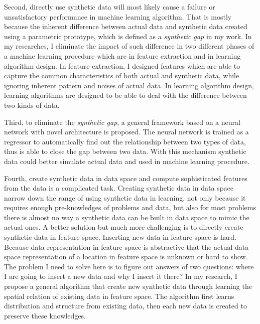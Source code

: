 \documentclass{iitthesis}
\begin{document}
Second, directly use synthetic data will most likely cause a failure or unsatisfactory performance in machine learning algorithm. That is mostly because the inherent difference between actual data and synthetic data created using a parametric prototype, which is defined as a \textit{synthetic gap} in my work. In my researches, I eliminate the impact of such difference in two different phases of a machine learning procedure which are in feature extraction and in learning algorithm design. In feature extraction, I designed features which are able to capture the common characteristics of both actual and synthetic data, while ignoring inherent pattern and noises of actual data. In learning algorithm design, learning algorithms are designed to be able to deal with the difference between two kinds of data. 

Third, to eliminate the \textit{synthetic gap}, a general framework based on a neural network with novel architecture is proposed. The neural network is trained as a regressor to automatically find out the relationship between two types of data, thus is able to close the gap between two data. With this mechanism synthetic data could better simulate actual data and used in machine learning procedure.

Fourth, create synthetic data in data space and compute sophisticated features from the data is a complicated task. Creating synthetic data in data space narrow down the range of using synthetic data in learning, not only because it requires enough pre-knowledges of problems and data, but also for most problems there is almost no way a synthetic data can be built in data space to mimic the actual ones. A better solution but much more challenging is to directly create synthetic data in feature space. Inserting new data in feature space is hard. Because data representation in feature space is abstractive that the actual data space representation of a location in feature space is unknown or hard to show. The problem I need to solve here is to figure out answers of two questions: where I are going to insert a new data and why I insert it there? In my research, I propose a general algorithm that create new synthetic data through learning the spatial relation of existing data in feature space. The algorithm first learns distribution and structure from existing data, then each new
data is created to preserve these knowledges.



\clearpage


%
%
%
%
%
%
%
%
%


 

\end{document}
